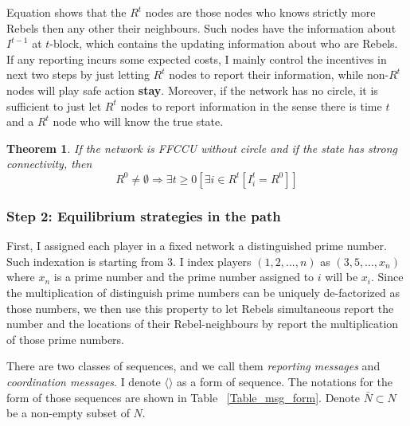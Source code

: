 \documentclass[12pt,letter]{article}
\newtheorem{theorem}{Theorem}
\theoremstyle{definition}
\theoremstyle{remark}
\theoremstyle{claim}
\begin{document}
Equation shows that the $R^t$ nodes are those nodes who knows strictly more Rebels then any other their neighbours. Such nodes have the information about $I^{t-1}$ at $t$-block, which contains the updating information about who are Rebels. If any reporting incurs some expected costs, I mainly control the incentives in next two steps by just letting $R^t$ nodes to report their information, while non-$R^t$ nodes will play safe action \textbf{stay}. Moreover, if the network has no circle, it is sufficient to just let $R^t$ nodes to report information in the sense there is time $t$ and a $R^t$ node who will know the true state. 
\begin{theorem}
\label{lemma_empty}
If the network is FFCCU without circle and if the state has strong connectivity, then 
\[R^0\neq \emptyset \Rightarrow \exists t\geq 0[\exists i\in R^t[I^t_i=R^0]]\]
\end{theorem}



\subsubsection{Step 2: Equilibrium strategies in the path}


First, I assigned each player in a fixed network a distinguished prime number. Such indexation is starting from $3$. I index players $(1,2,...,n)$ as $(3,5,...,x_n)$ where $x_n$ is a prime number and the prime number assigned to $i$ will be $x_i$. Since the multiplication of distinguish prime numbers can be uniquely de-factorized as those numbers, we then use this property to let Rebels simultaneous report the number and the locations of their Rebel-neighbours by report the multiplication of those prime numbers.

There are two classes of sequences, and we call them \textit{reporting messages} and \textit{coordination messages}. I denote $\langle\rangle$ as a form of sequence. The notations for the form of those sequences are shown in Table ~\ref{Table_msg_form}. Denote $\bar{N}\subset N$ be a non-empty subset of $N$.
\end{document}
